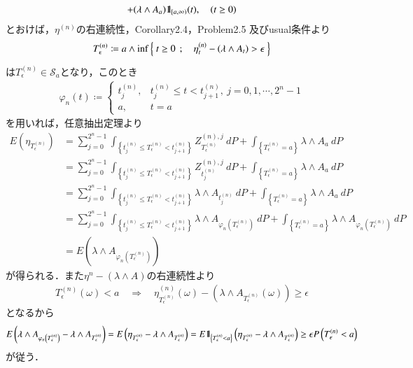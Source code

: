 \begin{prf}
\begin{description}
\begin{align}
						+ (\lambda \wedge A_a) \mbox{1}\hspace{-0.25em}\mbox{l}_{[a,\infty)}(t),
					\quad (t \geq 0)
				\end{align}
				とおけば，$\eta^{(n)}$の右連続性，Corollary2.4，Problem2.5 及びusual条件より
				\begin{align}
					T^{(n)}_\epsilon \coloneqq
					a \wedge \operatorname*{inf}_{} \left\{\ t \geq 0\ \, ; \quad \eta^{(n)}_t - (\lambda \wedge A_t) > \epsilon\ \right\}
				\end{align}
				は$T^{(n)}_\epsilon \in \mathscr{S}_a$となり，このとき
				\begin{align}
					\varphi_n(t) \coloneqq 
					\begin{cases}
						t^{(n)}_j, & t^{(n)}_j \leq t < t^{(n)}_{j+1},\ j=0,1,\cdots,2^n-1 \\
						a, & t = a
					\end{cases}
				\end{align}
				を用いれば，任意抽出定理より
				\begin{align}
					E\left( \eta_{T^{(n)}_\epsilon} \right)
					&= \sum_{j=0}^{2^n-1} \int_{\left\{t^{(n)}_j \leq T^{(n)}_\epsilon < t^{(n)}_{j+1}\right\}} Z^{(n),j}_{T^{(n)}_\epsilon}\ dP
						+ \int_{\left\{T^{(n)}_\epsilon = a\right\}} \lambda \wedge A_a\ dP \\
					&= \sum_{j=0}^{2^n-1} \int_{\left\{t^{(n)}_j \leq T^{(n)}_\epsilon < t^{(n)}_{j+1}\right\}} Z^{(n),j}_{t^{(n)}_j}\ dP
						+ \int_{\left\{T^{(n)}_\epsilon = a\right\}} \lambda \wedge A_a\ dP \\
					&= \sum_{j=0}^{2^n-1} \int_{\left\{t^{(n)}_j \leq T^{(n)}_\epsilon < t^{(n)}_{j+1}\right\}} \lambda \wedge A_{t^{(n)}_j}\ dP
						+ \int_{\left\{T^{(n)}_\epsilon = a\right\}} \lambda \wedge A_a\ dP \\
					&= \sum_{j=0}^{2^n-1} \int_{\left\{t^{(n)}_j \leq T^{(n)}_\epsilon < t^{(n)}_{j+1}\right\}} \lambda \wedge A_{\varphi_n\left(T^{(n)}_\epsilon\right)}\ dP
						+ \int_{\left\{T^{(n)}_\epsilon = a\right\}} \lambda \wedge A_{\varphi_n\left(T^{(n)}_\epsilon\right)}\ dP \\
					&= E\left(\lambda \wedge A_{\varphi_n\left(T^{(n)}_\epsilon\right)}\right)
				\end{align}
				が得られる．また$\eta^{n} - (\lambda \wedge A)$の右連続性より
				\begin{align}
					T^{(n)}_\epsilon(\omega) < a
					\quad \Longrightarrow
					\quad \eta^{(n)}_{T^{(n)}_\epsilon}(\omega) - \left(\lambda \wedge A_{T^{(n)}_\epsilon}(\omega)\right) \geq \epsilon
				\end{align}
				となるから
				\begin{align}
					E\left(\lambda \wedge A_{\varphi_n\left(T^{(n)}_\epsilon\right)}
						- \lambda \wedge A_{T^{(n)}_\epsilon} \right)
					= E\left(\eta_{T^{(n)}_\epsilon}
						- \lambda \wedge A_{T^{(n)}_\epsilon} \right)
					= E\mbox{1}\hspace{-0.25em}\mbox{l}_{\left\{T^{(n)}_\epsilon < a\right\}}\left(\eta_{T^{(n)}_\epsilon}
						- \lambda \wedge A_{T^{(n)}_\epsilon} \right)
					\geq \epsilon P\left(T^{(n)}_\epsilon < a\right)
				\end{align}
				が従う．
				

\end{description}
\end{prf}
